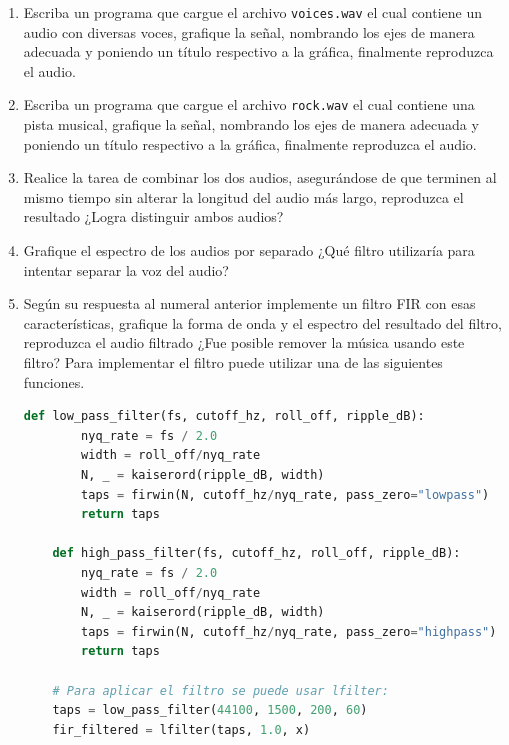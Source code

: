 \documentclass[a4paper,12pt]{article} %
\begin{document}
\begin{enumerate}
    \item Escriba un programa que cargue el archivo \verb|voices.wav| el cual contiene un audio con diversas voces, grafique la señal, nombrando los ejes de manera adecuada y poniendo un título respectivo a la gráfica, finalmente reproduzca el audio.

    \item Escriba un programa que cargue el archivo \verb|rock.wav| el cual contiene una pista musical, grafique la señal, nombrando los ejes de manera adecuada y poniendo un título respectivo a la gráfica, finalmente reproduzca el audio.

    \item Realice la tarea de combinar los dos audios, asegurándose de que terminen al mismo tiempo sin alterar la longitud del audio más largo, reproduzca el resultado ¿Logra distinguir ambos audios?

    \item Grafique el espectro de los audios por separado ¿Qué filtro utilizaría para intentar separar la voz del audio?

    \item Según su respuesta al numeral anterior implemente un filtro FIR con esas características, grafique la forma de onda y el espectro del resultado del filtro, reproduzca el audio filtrado ¿Fue posible remover la música usando este filtro? Para implementar el filtro puede utilizar una de las siguientes funciones.

    \begin{lstlisting}[language=python]
    def low_pass_filter(fs, cutoff_hz, roll_off, ripple_dB):
        nyq_rate = fs / 2.0
        width = roll_off/nyq_rate
        N, _ = kaiserord(ripple_dB, width)
        taps = firwin(N, cutoff_hz/nyq_rate, pass_zero="lowpass")
        return taps

    def high_pass_filter(fs, cutoff_hz, roll_off, ripple_dB):
        nyq_rate = fs / 2.0
        width = roll_off/nyq_rate
        N, _ = kaiserord(ripple_dB, width)
        taps = firwin(N, cutoff_hz/nyq_rate, pass_zero="highpass")
        return taps
    
    # Para aplicar el filtro se puede usar lfilter:
    taps = low_pass_filter(44100, 1500, 200, 60)
    fir_filtered = lfilter(taps, 1.0, x)
    \end{lstlisting}


\end{enumerate}
\end{document}
